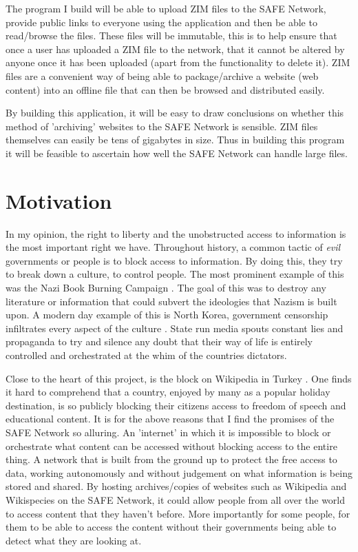 \documentclass{l4proj}
\begin{document}
The program I build will be able to upload ZIM\cite{zim} files to the SAFE Network, provide public links to everyone using the application and then be able to read/browse the files. These files will be immutable, this is to help ensure that once a user has uploaded a ZIM file to the network, that it cannot be altered by anyone once it has been uploaded (apart from the functionality to delete it). ZIM files are a convenient way of being able to package/archive a website (web content) into an offline file that can then be browsed and distributed easily.

By building this application, it will be easy to draw conclusions on whether this method of 'archiving' websites to the SAFE Network is sensible. ZIM files themselves can easily be tens of gigabytes in size. Thus in building this program it will be feasible to ascertain how well the SAFE Network can handle large files.

\section{Motivation}

In my opinion, the right to liberty and the unobstructed access to information is the most important right we have. Throughout history, a common tactic of \textit{evil} governments or people is to block access to information. By doing this, they try to break down a culture, to control people. The most prominent example of this was the Nazi Book Burning Campaign \cite{book-burning}. The goal of this was to destroy any literature or information that could subvert the ideologies that Nazism is built upon. A modern day example of this is North Korea, government censorship infiltrates every aspect of the culture \cite{north-korean-media}. State run media spouts constant lies and propaganda to try and silence any doubt that their way of life is entirely controlled and orchestrated at the whim of the countries dictators. 

Close to the heart of this project, is the block on Wikipedia in Turkey \cite{turkey}. One finds it hard to comprehend that a country, enjoyed by many as a popular holiday destination, is so publicly blocking their citizens access to freedom of speech and educational content. It is for the above reasons that I find the promises of the SAFE Network so alluring. An 'internet' in which it is impossible to block or orchestrate what content can be accessed without blocking access to the entire thing. A network that is built from the ground up to protect the free access to data, working autonomously and without judgement on what information is being stored and shared. By hosting archives/copies of websites such as Wikipedia and Wikispecies on the SAFE Network, it could allow people from all over the world to access content that they haven't before. More importantly for some people, for them to be able to access the content without their governments being able to detect what they are looking at.

\printbibliography
\end{document}
